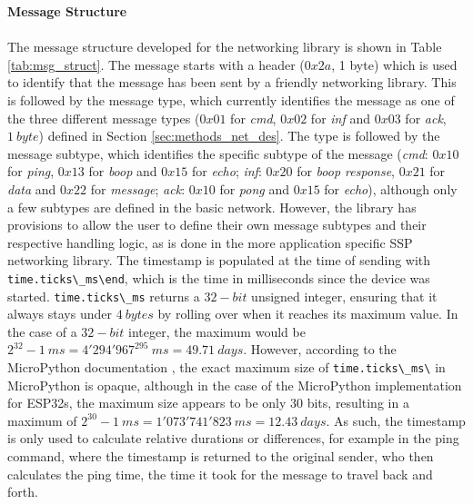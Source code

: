 \textbf{\label{sec:methods_msg_struct}Message Structure}\\\\
The message structure developed for the networking library is shown in Table \ref{tab:msg_struct}. The message starts with a header ($0x2a$, 1 byte) which is used to identify that the message has been sent by a friendly networking library. 
This is followed by the message type, which currently identifies the message as one of the three different message types ($0x01$ for \textit{cmd}, $0x02$ for \textit{inf} and $0x03$ for \textit{ack}, $1\ byte$) defined in Section \ref{sec:methods_net_des}. 
The type is followed by the message subtype, which identifies the specific subtype of the message (\textit{cmd}: $0x10$ for \textit{ping}, $0x13$ for \textit{boop} and $0x15$ for \textit{echo}; \textit{inf}: $0x20$ for \textit{boop response}, $0x21$ for \textit{data} and $0x22$ for \textit{message}; \textit{ack}: $0x10$ for \textit{pong} and $0x15$ for \textit{echo}), although only a few subtypes are defined in the basic network. However, the library has provisions to allow the user to define their own message subtypes and their respective handling logic, as is done in the more application specific SSP networking library.
The timestamp is populated at the time of sending with \verb!time.ticks\_ms\end!, which is the time in milliseconds since the device was started. \verb!time.ticks\_ms! returns a $32-bit$ unsigned integer, ensuring that it always stays under $4\ bytes$ by rolling over when it reaches its maximum value. In the case of a $32-bit$ integer, the maximum would be $2^{32} -1\ ms = 4'294'967^295\ ms = 49.71\ days$. However, according to the MicroPython documentation \citep{micropython_micropython_2025-2}, the exact maximum size of \verb!time.ticks\_ms\! in MicroPython is opaque, although in the case of the MicroPython implementation for ESP32s, the maximum size appears to be only 30 bits, resulting in a maximum of $2^{30}-1\ ms=1'073'741'823\ ms = 12.43\ days$.
As such, the timestamp is only used to calculate relative durations or differences, for example in the ping command, where the timestamp is returned to the original sender, who then calculates the ping time, the time it took for the message to travel back and forth.
